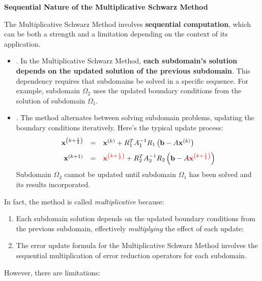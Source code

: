 \highspace
\begin{flushleft}
    \textcolor{Green3}{ \textbf{Sequential Nature of the Multiplicative Schwarz Method}}
\end{flushleft}
The Multiplicative Schwarz Method involves \textbf{sequential computation}, which can be both a strength and a limitation depending on the context of its application. 
\begin{itemize}
    \item {}. In the Multiplicative Schwarz Method, \textbf{each subdomain's solution depends on the updated solution of the previous subdomain}. This dependency requires that subdomains be solved in a specific sequence. For example, subdomain $\Omega_{2}$ uses the updated boundary conditions from the solution of subdomain $\Omega_{1}$.


    \item {}. The method alternates between solving subdomain problems, updating the boundary conditions iteratively. Here's the typical update process:
    \begin{equation*}
        \begin{array}{rcl}
            \mathbf{x}^{\left(k+\frac{1}{2}\right)} &=& \mathbf{x}^{(k)} + R_{1}^{T} A_{1}^{-1} R_{1} \left(\mathbf{b} - A \mathbf{x}^{(k)}\right) \\ [.7em]
            \mathbf{x}^{(k+1)} &=& \textcolor{Red2}{\mathbf{x}^{\left(k+\frac{1}{2}\right)}} + R_{2}^{T} A_{2}^{-1} R_{2} \left(\mathbf{b} - A \textcolor{Red2}{\mathbf{x}^{\left(k+\frac{1}{2}\right)}}\right)
        \end{array}
    \end{equation*}
    Subdomain $\Omega_{2}$ cannot be updated until subdomain $\Omega_{1}$ has been solved and its results incorporated.
\end{itemize}
In fact, the method is called \emph{multiplicative} because:
\begin{enumerate}
    \item Each subdomain solution depends on the updated boundary conditions from the previous subdomain, effectively \emph{multiplying} the effect of each update;
    \item The error update formula for the Multiplicative Schwarz Method involves the sequential multiplication of error reduction operators for each subdomain.
\end{enumerate}
However, there are limitations:
